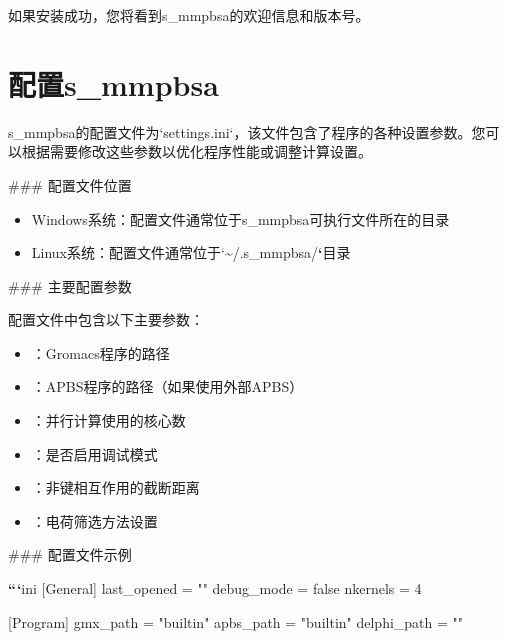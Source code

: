 \documentclass[letterpaper,10pt,english]{sphinxmanual}
\begin{document}
\sphinxAtStartPar
如果安装成功，您将看到s\_mmpbsa的欢迎信息和版本号。


\section{配置s\_mmpbsa}
\label{\detokenize{installation:s-mmpbsa}}
\sphinxAtStartPar
s\_mmpbsa的配置文件为`settings.ini`，该文件包含了程序的各种设置参数。您可以根据需要修改这些参数以优化程序性能或调整计算设置。

\sphinxAtStartPar
\#\#\# 配置文件位置
\begin{itemize}
\item {} 
\sphinxAtStartPar
Windows系统：配置文件通常位于s\_mmpbsa可执行文件所在的目录

\item {} 
\sphinxAtStartPar
Linux系统：配置文件通常位于`\textasciitilde{}/.s\_mmpbsa/{\color{red}\bfseries{}`}目录

\end{itemize}

\sphinxAtStartPar
\#\#\# 主要配置参数

\sphinxAtStartPar
配置文件中包含以下主要参数：
\begin{itemize}
\item {} 
\sphinxAtStartPar
{}：Gromacs程序的路径

\item {} 
\sphinxAtStartPar
{}：APBS程序的路径（如果使用外部APBS）

\item {} 
\sphinxAtStartPar
{}：并行计算使用的核心数

\item {} 
\sphinxAtStartPar
{}：是否启用调试模式

\item {} 
\sphinxAtStartPar
{}：非键相互作用的截断距离

\item {} 
\sphinxAtStartPar
{}：电荷筛选方法设置

\end{itemize}

\sphinxAtStartPar
\#\#\# 配置文件示例

\sphinxAtStartPar
{\color{red}\bfseries{}``}{\color{red}\bfseries{}`}ini
{[}General{]}
last\_opened = ""
debug\_mode = false
nkernels = 4

\sphinxAtStartPar
{[}Program{]}
gmx\_path = "built\sphinxhyphen{}in"
apbs\_path = "built\sphinxhyphen{}in"
delphi\_path = ""
\end{document}
